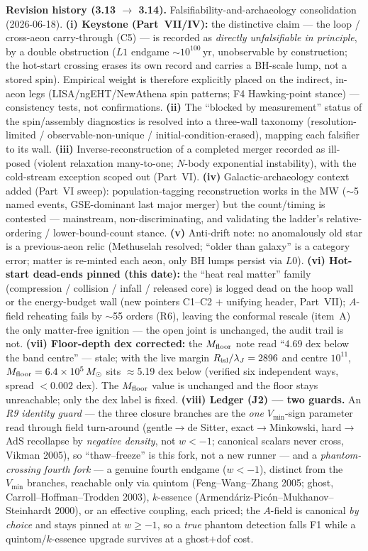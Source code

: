\documentclass[11pt]{article}
\newcommand{\msun}{M_\odot}
\begin{document}
{\noindent\textbf{Revision history (3.13 $\to$ 3.14).} Falsifiability-and-archaeology consolidation (2026-06-18). \textbf{(i) Keystone (Part~VII/IV):} the distinctive claim --- the loop / cross-aeon carry-through (C5) --- is recorded as \emph{directly unfalsifiable in principle}, by a double obstruction ($L1$ endgame $\sim10^{100}$\,yr, unobservable by construction; the hot-start crossing erases its own record and carries a BH-scale lump, not a stored spin). Empirical weight is therefore explicitly placed on the indirect, in-aeon legs (LISA/ngEHT/NewAthena spin patterns; F4 Hawking-point stance) --- consistency tests, not confirmations. \textbf{(ii)} The ``blocked by measurement'' status of the spin/assembly diagnostics is resolved into a three-wall taxonomy (resolution-limited / observable-non-unique / initial-condition-erased), mapping each falsifier to its wall. \textbf{(iii)} Inverse-reconstruction of a completed merger recorded as ill-posed (violent relaxation many-to-one; $N$-body exponential instability), with the cold-stream exception scoped out (Part~VI). \textbf{(iv)} Galactic-archaeology context added (Part~VI sweep): population-tagging reconstruction works in the MW ($\sim$5 named events, GSE-dominant last major merger) but the count/timing is contested --- mainstream, non-discriminating, and validating the ladder's relative-ordering / lower-bound-count stance. \textbf{(v)} Anti-drift note: no anomalously old star is a previous-aeon relic (Methuselah resolved; ``older than galaxy'' is a category error; matter is re-minted each aeon, only BH lumps persist via $L0$). \textbf{(vi) Hot-start dead-ends pinned (this date):} the ``heat real matter'' family (compression / collision / infall / released core) is logged dead on the hoop wall or the energy-budget wall (new pointers C1--C2 $+$ unifying header, Part~VII); $A$-field reheating fails by $\sim$55 orders (R6), leaving the conformal rescale (item~A) the only matter-free ignition --- the open joint is unchanged, the audit trail is not. \textbf{(vii) Floor-depth dex corrected:} the $M_{\rm floor}$ note read ``4.69 dex below the band centre'' --- stale; with the live margin $R_{\rm isl}/\lambda_J=2896$ and centre $10^{11}$, $M_{\rm floor}=6.4\times10^{5}\,\msun$ sits $\approx$5.19 dex below (verified six independent ways, spread $<0.002$ dex). The $M_{\rm floor}$ value is unchanged and the floor stays unreachable; only the dex label is fixed. \textbf{(viii) Ledger (J2) --- two guards.} An \emph{R9 identity guard} --- the three closure branches are the \emph{one} $V_{\min}$-sign parameter read through field turn-around (gentle$\to$de Sitter, exact$\to$Minkowski, hard$\to$AdS recollapse by \emph{negative density}, not $w<-1$; canonical scalars never cross, Vikman 2005), so ``thaw--freeze'' is this fork, not a new runner --- and a \emph{phantom-crossing fourth fork} --- a genuine fourth endgame ($w<-1$), distinct from the $V_{\min}$ branches, reachable only via quintom (Feng--Wang--Zhang 2005; ghost, Carroll--Hoffman--Trodden 2003), $k$-essence (Armend\'ariz-Pic\'on--Mukhanov--Steinhardt 2000), or an effective coupling, each priced; the $A$-field is canonical \emph{by choice} and stays pinned at $w\ge-1$, so a \emph{true} phantom detection falls F1 while a quintom/$k$-essence upgrade survives at a ghost$+$dof cost. }
\end{document}
